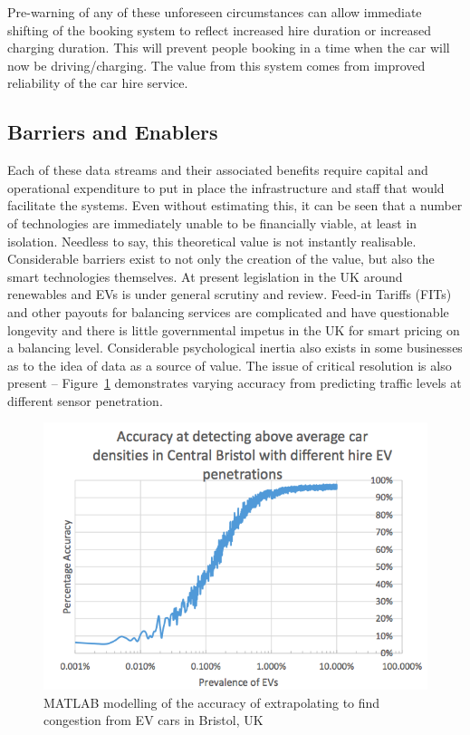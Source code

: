 \documentclass[journal]{IEEEtran}
\begin{document}
Pre-warning of any of these unforeseen circumstances can allow
immediate shifting of the booking system to reflect increased hire
duration or increased charging duration. This will prevent people
booking in a time when the car will now be driving/charging. The value
from this system comes from improved reliability of the car hire
service.

\subsection{Barriers and Enablers}

Each of these data streams and their associated benefits require
capital and operational expenditure to put in place the infrastructure
and staff that would facilitate the systems. Even without estimating
this, it can be seen that a number of technologies are immediately
unable to be financially viable, at least in isolation. Needless to
say, this theoretical value is not instantly realisable. Considerable
barriers exist to not only the creation of the value, but also the
smart technologies themselves. At present legislation in the UK around
renewables and EVs is under general scrutiny and review. Feed-in
Tariffs (FITs) and other payouts for balancing services are
complicated and have questionable longevity and there is little
governmental impetus in the UK for smart pricing on a balancing
level. Considerable psychological inertia also exists in some
businesses as to the idea of data as a source of value.  The issue of
critical resolution is also present --
Figure~\ref{fig:bristolcardensity} demonstrates varying accuracy from
predicting traffic levels at different sensor penetration.


\begin{figure}[!htp]
\centering
\includegraphics[width=\columnwidth]{images/bristolcardensity.png}
\caption{MATLAB modelling of the accuracy of extrapolating to find
  congestion from EV cars in Bristol, UK}
\label{fig:bristolcardensity}
\end{figure}
\end{document}
